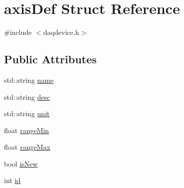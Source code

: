 \hypertarget{structaxisDef}{\section{axis\-Def Struct Reference}
\label{structaxisDef}
}


{\ttfamily \#include $<$daqdevice.\-h$>$}

\subsection*{Public Attributes}
\begin{DoxyCompactItemize}
\item 
std\-::string \hyperlink{structaxisDef_aad90dd24f442707e3c5cbc9a63ace2ac}{name}
\item 
std\-::string \hyperlink{structaxisDef_a2cb1c26f0d063ce888d83393c672d6d3}{desc}
\item 
std\-::string \hyperlink{structaxisDef_a5400e43536c69ae82dac0645699415fc}{unit}
\item 
float \hyperlink{structaxisDef_a82d8f9c129ca390eb253d2231ce6b8f3}{range\-Min}
\item 
float \hyperlink{structaxisDef_ae5b71d00e16d1270d602eaedd2e5ec88}{range\-Max}
\item 
bool \hyperlink{structaxisDef_aea953fb050c60d7260882239ca0672f2}{is\-New}
\item 
int \hyperlink{structaxisDef_a1d36c9abefe4d6788f325ebc5278a8e8}{id}
\end{DoxyCompactItemize}


